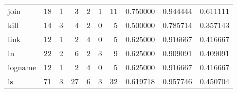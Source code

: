 \begin{longtable}{lrrrrrrrrr}
join      &                                      18 &                                                  1 &                                                  3 &                                                  2 &                                                  1 &                                                 11 &                                           0.750000 &                               0.944444 &                             0.611111 \\
kill      &                                      14 &                                                  3 &                                                  4 &                                                  2 &                                                  0 &                                                  5 &                                           0.500000 &                               0.785714 &                             0.357143 \\
link      &                                      12 &                                                  1 &                                                  2 &                                                  4 &                                                  0 &                                                  5 &                                           0.625000 &                               0.916667 &                             0.416667 \\
ln        &                                      22 &                                                  2 &                                                  6 &                                                  2 &                                                  3 &                                                  9 &                                           0.625000 &                               0.909091 &                             0.409091 \\
logname   &                                      12 &                                                  1 &                                                  2 &                                                  4 &                                                  0 &                                                  5 &                                           0.625000 &                               0.916667 &                             0.416667 \\
ls        &                                      71 &                                                  3 &                                                 27 &                                                  6 &                                                  3 &                                                 32 &                                           0.619718 &                               0.957746 &                             0.450704 \\

\end{longtable}
